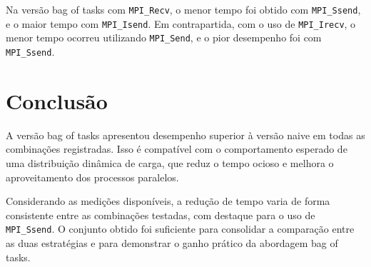 \documentclass[12pt,a4paper]{article}
\begin{document}
Na versão bag of tasks com \texttt{MPI\_Recv}, o menor tempo foi obtido com \texttt{MPI\_Ssend}, e o maior tempo com \texttt{MPI\_Isend}. Em contrapartida, com o uso de \texttt{MPI\_Irecv}, o menor tempo ocorreu utilizando \texttt{MPI\_Send}, e o pior desempenho foi com \texttt{MPI\_Ssend}.

\section{Conclusão}
A versão bag of tasks apresentou desempenho superior à versão naive em todas as combinações registradas. Isso é compatível com o comportamento esperado de uma distribuição dinâmica de carga, que reduz o tempo ocioso e melhora o aproveitamento dos processos paralelos.

Considerando as medições disponíveis, a redução de tempo varia de forma consistente entre as combinações testadas, com destaque para o uso de \texttt{MPI\_Ssend}. O conjunto obtido foi suficiente para consolidar a comparação entre as duas estratégias e para demonstrar o ganho prático da abordagem bag of tasks.
\end{document}
